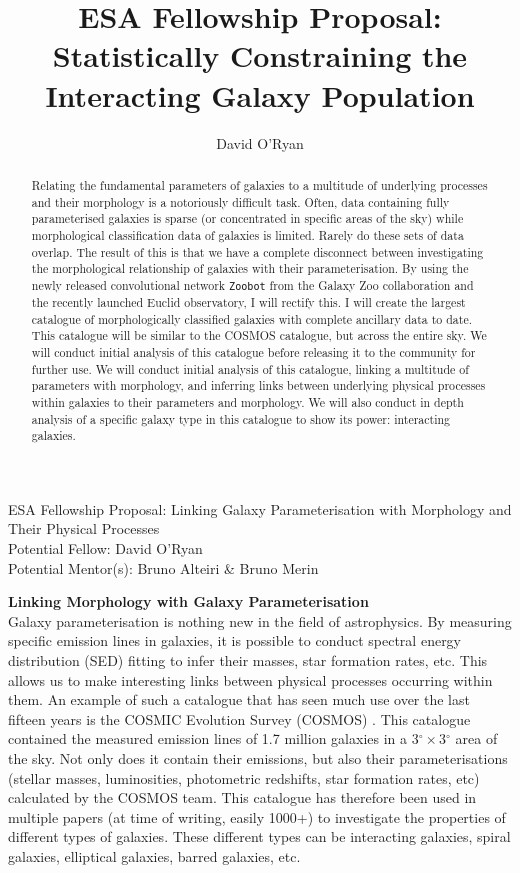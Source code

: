 \documentclass[11pt,usenatbib]{article}
\title{ESA Fellowship Proposal: Statistically Constraining the Interacting Galaxy Population}
\author{David O'Ryan}
\begin{document}
    \begin{center}
        \large{{ESA Fellowship Proposal: Linking Galaxy Parameterisation with Morphology and Their Physical Processes \\
        Potential Fellow: David O'Ryan \\
        Potential Mentor(s): Bruno Alteiri \& Bruno Merin}}
    \end{center}
\vspace{-7mm}
\begin{abstract}
\vspace{-3.5mm}
Relating the fundamental parameters of galaxies to a multitude of underlying processes and their morphology is a notoriously difficult task. Often, data containing fully parameterised galaxies is sparse (or concentrated in specific areas of the sky) while morphological classification data of galaxies is limited. Rarely do these sets of data overlap. The result of this is that we have a complete disconnect between investigating the morphological relationship of galaxies with their parameterisation. By using the newly released convolutional network \texttt{Zoobot} from the Galaxy Zoo collaboration and the recently launched Euclid observatory, I will rectify this. I will create the largest catalogue of morphologically classified galaxies with complete ancillary data to date. This catalogue will be similar to the COSMOS catalogue, but across the entire sky. We will conduct initial analysis of this catalogue before releasing it to the community for further use. We will conduct initial analysis of this catalogue, linking a multitude of parameters with morphology, and inferring links between underlying physical processes within galaxies to their parameters and morphology. We will also conduct in depth analysis of a specific galaxy type in this catalogue to show its power: interacting galaxies. 
\end{abstract}

\vspace{-5mm}
\justification
\vspace{-3mm}
\noindent\textbf{Linking Morphology with Galaxy Parameterisation} \\
Galaxy parameterisation is nothing new in the field of astrophysics. By measuring specific emission lines in galaxies, it is possible to conduct spectral energy distribution (SED) fitting to infer their masses, star formation rates, etc. This allows us to make interesting links between physical processes occurring within them. An example of such a catalogue that has seen much use over the last fifteen years is the COSMIC Evolution Survey (COSMOS) \citep{cosmos catalogue}. This catalogue contained the measured emission lines of 1.7 million galaxies in a 3$^{\circ} \times $3$^{\circ}$ area of the sky. Not only does it contain their emissions, but also their parameterisations (stellar masses, luminosities, photometric redshifts, star formation rates, etc) calculated by the COSMOS team. This catalogue has therefore been used in multiple papers (at time of writing, easily 1000+) to investigate the properties of different types of galaxies. These different types can be interacting galaxies, spiral galaxies, elliptical galaxies, barred galaxies, etc.
\end{document}
